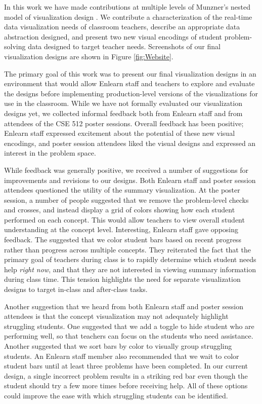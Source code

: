 \documentclass{sigchi}
\begin{document}
In this work we have made contributions at multiple levels of Munzner's nested model of visualization design \cite{Munzner09}. We contribute a characterization of the real-time data visualization needs of classroom teachers, describe an appropriate data abstraction designed, and present two new visual encodings of student problem-solving data designed to target teacher needs. Screenshots of our final visualization designs are shown in Figure \ref{fig:Website}.

The primary goal of this work was to present our final visualization designs in an environment that would allow Enlearn staff and teachers to explore and evaluate the designs before implementing production-level versions of the visualizations for use in the classroom. While we have not formally evaluated our visualization designs yet, we collected informal feedback both from Enlearn staff and from attendees of the CSE 512 poster sessions. Overall feedback has been positive; Enlearn staff expressed excitement about the potential of these new visual encodings, and poster session attendees liked the visual designs and expressed an interest in the problem space.

While feedback was generally positive, we received a number of suggestions for improvements and revisions to our designs. Both Enlearn staff and poster session attendees questioned the utility of the summary visualization. At the poster session, a number of people suggested that we remove the problem-level checks and crosses, and instead display a grid of colors showing how each student performed on each concept. This would allow teachers to view overall student understanding at the concept level. Interesting, Enlearn staff gave opposing feedback. The suggested that we color student bars based on recent progress rather than progress across multiple concepts. They reiterated the fact that the primary goal of teachers during class is to rapidly determine which student needs help \emph{right now}, and that they are not interested in viewing summary information during class time. This tension highlights the need for separate visualization designs to target in-class and after-class tasks.

Another suggestion that we heard from both Enlearn staff and poster session attendees is that the concept visualization may not adequately highlight struggling students. One suggested that we add a toggle to hide student who are performing well, so that teachers can focus on the students who need assistance. Another suggested that we sort bars by color to visually group struggling students. An Enlearn staff member also recommended that we wait to color student bars until at least three problems have been completed. In our current design, a single incorrect problem results in a striking red bar even though the student should try a few more times before receiving help. All of these options could improve the ease with which struggling students can be identified.
\end{document}
